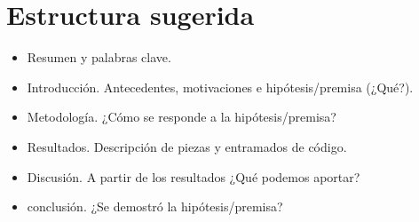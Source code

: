 \section*{Estructura sugerida}

\begin{itemize}

\item Resumen y palabras clave.
\item Introducción. Antecedentes,  motivaciones e hipótesis/premisa (¿Qué?).
\item Metodología. ¿Cómo se responde a la hipótesis/premisa?
\item Resultados. Descripción de piezas y entramados de código.
\item Discusión. A partir de los resultados ¿Qué podemos aportar?
\item conclusión. ¿Se demostró la hipótesis/premisa? 
  
\end{itemize}
